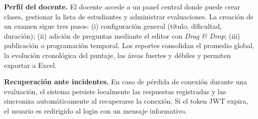 \textbf{Perfil del docente.} El docente accede a un panel central donde puede crear clases, gestionar la lista de estudiantes y administrar evaluaciones. La creación de un examen sigue tres pasos: (i) configuración general (título, dificultad, duración); (ii) adición de preguntas mediante el editor con \textit{Drag \& Drop}; (iii) publicación o programación temporal. Los reportes consolidan el promedio global, la evolución cronológica del puntaje, las áreas fuertes y débiles y permiten exportar a Excel.

\textbf{Recuperación ante incidentes.} En caso de pérdida de conexión durante una evaluación, el sistema persiste localmente las respuestas registradas y las sincroniza automáticamente al recuperarse la conexión. Si el token JWT expira, el usuario es redirigido al login con un mensaje informativo.